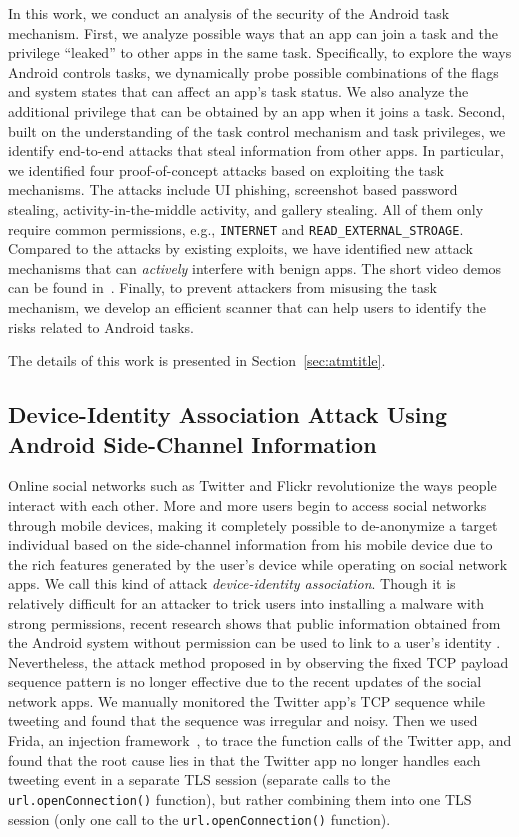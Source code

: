 \documentclass[letterpaper,12pt]{article}
\begin{document}
In this work, we conduct an analysis of the security of the Android
task mechanism. First, we analyze possible ways that an app can join a task
and the privilege ``leaked'' to other apps in the same
task. Specifically, to explore the ways Android controls tasks, we
dynamically probe possible combinations of the flags and system states
that can affect an app's task status.  We also analyze the additional
privilege that can be obtained by an app when it joins a task. Second, built on the understanding of the task control mechanism and task privileges, we identify end-to-end attacks that steal information from other apps. In particular, we identified four proof-of-concept attacks based on exploiting the task mechanisms. The attacks include
UI phishing, screenshot based password stealing, activity-in-the-middle
activity, and gallery stealing. All of them only require common
permissions, e.g., \texttt{INTERNET} and \texttt{READ\_EXTERNAL\_STROAGE}. Compared to
the attacks by existing exploits, we have identified new attack
mechanisms that can {\em actively} interfere with benign apps. The
short video demos can be found in~\cite{demo}. Finally, to prevent attackers from misusing the task mechanism, we develop an efficient scanner that can help users to
identify the risks related to Android tasks.

The details of this work is presented in Section~\ref{sec:atmtitle}. 

\subsection{Device-Identity Association Attack Using Android Side-Channel Information}
Online social networks such as Twitter and Flickr revolutionize the ways people interact with each other. More and more users begin to access social networks through mobile devices, making it completely possible to de-anonymize a target individual based on the side-channel information from his mobile device due to the rich features generated by the user's device while operating on social network apps. We call this kind of attack \emph{device-identity association}. Though it is relatively difficult for an attacker to trick users into installing a malware with strong permissions, recent research shows that public information obtained from the Android system without permission can be used to link to a user's identity \cite{zhou2013identity}. Nevertheless, the attack method proposed in \cite{zhou2013identity} by observing the fixed TCP payload sequence pattern is no longer effective due to the recent updates of the social network apps. We manually monitored the Twitter app's TCP sequence while tweeting and found that the sequence was irregular and noisy. Then we used Frida, an injection framework~\cite{frida}, to trace the function calls of the Twitter app, and found that the root cause lies in that the Twitter app no longer handles each tweeting event in a separate TLS session (separate calls to the \texttt{url.openConnection()} function), but rather combining them into one TLS session (only one call to the \texttt{url.openConnection()} function).
\end{document}
